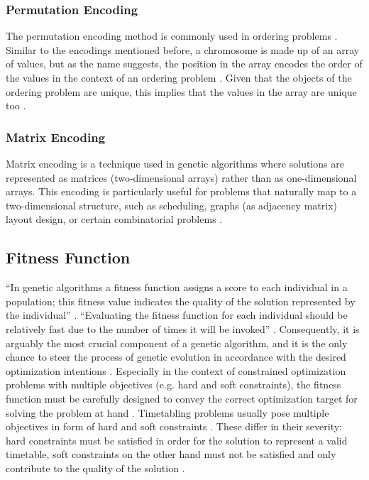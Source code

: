 \documentclass[sigconf]{acmart}
\begin{document}
\subsubsection{Permutation Encoding}
The permutation encoding method is commonly used in ordering problems
\cite{Katoch2021}. Similar to the encodings mentioned before, a chromosome
is made up of an array of values, but as the name suggests, the position in
the array encodes the order of the values in the context of an ordering problem
\cite{Katoch2021,Affenzeller2009}. Given that the objects of the ordering
problem are unique, this implies that the values in the array are unique too
\cite{Affenzeller2009}.

\subsubsection{Matrix Encoding}
Matrix encoding is a technique used in genetic algorithms where solutions are
represented as matrices (two-dimensional arrays) rather than as one-dimensional
arrays. This encoding is particularly useful for problems that
naturally map to a two-dimensional structure, such as scheduling, graphs
(as adjacency matrix) layout design, or certain combinatorial problems
\cite{Affenzeller2009}.



\subsection{Fitness Function}
\enquote{In genetic algorithms a fitness function assigns a score to each
individual in a population; this fitness value indicates the quality of the
solution represented by the individual} \cite{Affenzeller2009}.
\enquote{Evaluating the fitness function for each individual should be
relatively fast due to the number of times it will be invoked}
\cite{Affenzeller2009}.
Consequently, it is arguably the most crucial component of a genetic algorithm,
and it is the only chance to steer the process of genetic evolution in
accordance with the desired optimization intentions
\cite{Beligiannis2009,kinnear1994perspective}.
Especially in the context of constrained optimization problems with multiple
objectives (e.g. hard and soft constraints), the fitness function must be
carefully designed to convey the correct optimization target for solving the
problem at hand \cite{Beligiannis2009,Carr2014}.
Timetabling problems usually pose multiple objectives in form of hard and
soft constraints \cite{Beligiannis2009}. These differ in their severity:
hard constraints must be satisfied in order for the solution to represent a
valid timetable, soft constraints on the other hand must not be satisfied and
only contribute to the quality of the solution \cite{Beligiannis2009}.
\end{document}
